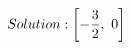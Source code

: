 \documentclass[preview]{standalone}
\begin{document}
\begin{align*}
\special{dvisvgm:raw <g id='unique000'>}Solution: \left[ - \frac{3}{2}, \  0\right]\special{dvisvgm:raw </g>}
\end{align*}
\end{document}
